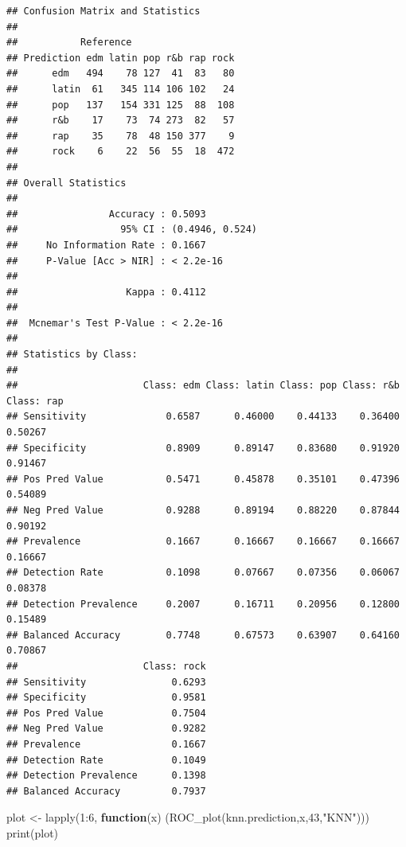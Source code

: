 \documentclass[
]{article}
\newenvironment{Shaded}{\begin{snugshade}}{\end{snugshade}}
\newcommand{\ControlFlowTok}[1]{\textcolor[rgb]{0.13,0.29,0.53}{\textbf{#1}}}
\newcommand{\DecValTok}[1]{\textcolor[rgb]{0.00,0.00,0.81}{#1}}
\newcommand{\FunctionTok}[1]{\textcolor[rgb]{0.00,0.00,0.00}{#1}}
\newcommand{\NormalTok}[1]{#1}
\newcommand{\OtherTok}[1]{\textcolor[rgb]{0.56,0.35,0.01}{#1}}
\newcommand{\SpecialCharTok}[1]{\textcolor[rgb]{0.00,0.00,0.00}{#1}}
\newcommand{\StringTok}[1]{\textcolor[rgb]{0.31,0.60,0.02}{#1}}
\begin{document}
\begin{verbatim}
## Confusion Matrix and Statistics
## 
##           Reference
## Prediction edm latin pop r&b rap rock
##      edm   494    78 127  41  83   80
##      latin  61   345 114 106 102   24
##      pop   137   154 331 125  88  108
##      r&b    17    73  74 273  82   57
##      rap    35    78  48 150 377    9
##      rock    6    22  56  55  18  472
## 
## Overall Statistics
##                                          
##                Accuracy : 0.5093         
##                  95% CI : (0.4946, 0.524)
##     No Information Rate : 0.1667         
##     P-Value [Acc > NIR] : < 2.2e-16      
##                                          
##                   Kappa : 0.4112         
##                                          
##  Mcnemar's Test P-Value : < 2.2e-16      
## 
## Statistics by Class:
## 
##                      Class: edm Class: latin Class: pop Class: r&b Class: rap
## Sensitivity              0.6587      0.46000    0.44133    0.36400    0.50267
## Specificity              0.8909      0.89147    0.83680    0.91920    0.91467
## Pos Pred Value           0.5471      0.45878    0.35101    0.47396    0.54089
## Neg Pred Value           0.9288      0.89194    0.88220    0.87844    0.90192
## Prevalence               0.1667      0.16667    0.16667    0.16667    0.16667
## Detection Rate           0.1098      0.07667    0.07356    0.06067    0.08378
## Detection Prevalence     0.2007      0.16711    0.20956    0.12800    0.15489
## Balanced Accuracy        0.7748      0.67573    0.63907    0.64160    0.70867
##                      Class: rock
## Sensitivity               0.6293
## Specificity               0.9581
## Pos Pred Value            0.7504
## Neg Pred Value            0.9282
## Prevalence                0.1667
## Detection Rate            0.1049
## Detection Prevalence      0.1398
## Balanced Accuracy         0.7937
\end{verbatim}

\begin{Shaded}
\begin{Highlighting}[]
\NormalTok{plot }\OtherTok{\textless{}{-}} \FunctionTok{lapply}\NormalTok{(}\DecValTok{1}\SpecialCharTok{:}\DecValTok{6}\NormalTok{, }\ControlFlowTok{function}\NormalTok{(x) (}\FunctionTok{ROC\_plot}\NormalTok{(knn.prediction,x,}\DecValTok{43}\NormalTok{,}\StringTok{"KNN"}\NormalTok{)))}
\FunctionTok{print}\NormalTok{(plot)}
\end{Highlighting}
\end{Shaded}
\end{document}
